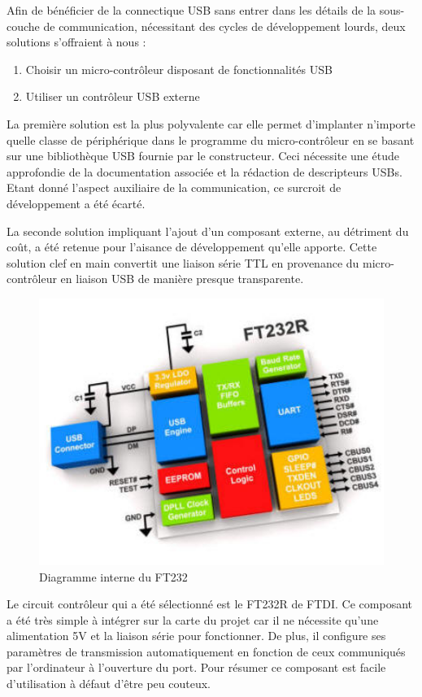 \documentclass[11pt, french]{article} %
\begin{document}
	Afin de bénéficier de la connectique USB sans entrer dans les détails de la sous-couche de communication, nécessitant des cycles de développement lourds, deux solutions s'offraient à nous :

\medskip
\begin{enumerate}
	\item Choisir un micro-contrôleur disposant de fonctionnalités USB
	\item Utiliser un contrôleur USB externe
\end{enumerate}

\medskip
La première solution est la plus polyvalente car elle permet d'implanter n'importe quelle classe de périphérique dans le programme du micro-contrôleur en se basant sur une bibliothèque USB fournie par le constructeur. Ceci nécessite une étude approfondie de la documentation associée et la rédaction de descripteurs USBs. Etant donné l'aspect auxiliaire de la communication, ce surcroit de développement a été écarté.

La seconde solution impliquant l'ajout d'un composant externe, au détriment du coût, a été retenue pour l'aisance de développement qu'elle apporte. Cette solution clef en main convertit une liaison série TTL en provenance du micro-contrôleur en liaison USB de manière presque transparente.

\begin{figure}[h!]
	\centering
	\includegraphics[width = 12cm]{SolutionNumerique/diagrammeFT232.jpg} 
	\caption{Diagramme interne du FT232}
\end{figure}

Le circuit contrôleur qui a été sélectionné est le FT232R de FTDI. Ce composant a été très simple à intégrer sur la carte du projet car il ne nécessite qu'une alimentation 5V et la liaison série pour fonctionner. De plus, il configure ses paramètres de transmission automatiquement en fonction de ceux communiqués par l'ordinateur à l'ouverture du port. Pour résumer ce composant est facile d'utilisation à défaut d'être peu couteux.
\end{document}
